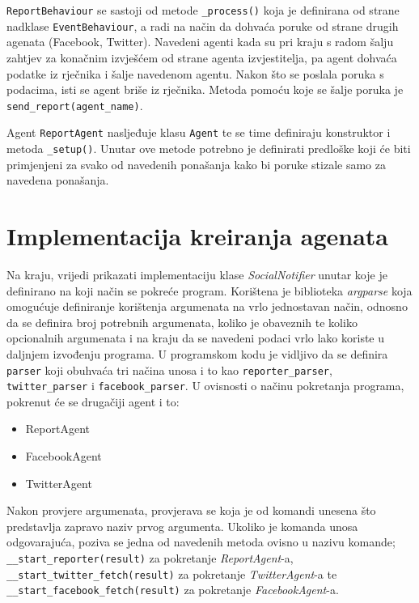 \documentclass[a4paper,12pt]{foi}
\begin{document}
\texttt{ReportBehaviour} se sastoji od metode \texttt{\_process()} koja je definirana od strane nadklase \texttt{EventBehaviour}, a radi na način da dohvaća poruke od strane drugih agenata (Facebook, Twitter). Navedeni agenti kada su pri kraju s radom šalju zahtjev za konačnim izvješćem od strane agenta izvjestitelja, pa agent dohvaća podatke iz rječnika i šalje navedenom agentu. Nakon što se poslala poruka s podacima, isti se agent briše iz rječnika. Metoda pomoću koje se šalje poruka je \texttt{send\_report(agent\_name)}.

Agent \texttt{ReportAgent} nasljeđuje klasu \texttt{Agent} te se time definiraju konstruktor i metoda \texttt{\_setup()}. Unutar ove metode potrebno je definirati predloške koji će biti primjenjeni za svako od navedenih ponašanja kako bi poruke stizale samo za navedena ponašanja.

\lstset{commentstyle=\textit,language=python}


\section{Implementacija kreiranja agenata}

Na kraju, vrijedi prikazati implementaciju klase \textit{SocialNotifier} unutar koje je definirano na koji način se pokreće program. Korištena je biblioteka \textit{argparse} koja omogućuje definiranje korištenja argumenata na vrlo jednostavan način, odnosno da se definira broj potrebnih argumenata, koliko je obaveznih te koliko opcionalnih argumenata i na kraju da se navedeni podaci vrlo lako koriste u daljnjem izvođenju programa. U programskom kodu je vidljivo da se definira \texttt{parser} koji obuhvaća tri načina unosa i to kao \texttt{reporter\_parser}, \texttt{twitter\_parser} i \texttt{facebook\_parser}. U ovisnosti o načinu pokretanja programa, pokrenut će se drugačiji agent i to:

\begin{itemize}
\item{ReportAgent}
\item{FacebookAgent}
\item{TwitterAgent}
\end{itemize}

Nakon provjere argumenata, provjerava se koja je od komandi unesena što predstavlja zapravo naziv prvog argumenta. Ukoliko je komanda unosa odgovarajuća, poziva se jedna od navedenih metoda ovisno u nazivu komande; \texttt{\_\_start\_reporter(result)} za pokretanje \textit{ReportAgent}-a, \texttt{\_\_start\_twitter\_fetch(result)} za pokretanje \textit{TwitterAgent}-a te \texttt{\_\_start\_facebook\_fetch(result)} za pokretanje \textit{FacebookAgent}-a.
\end{document}
